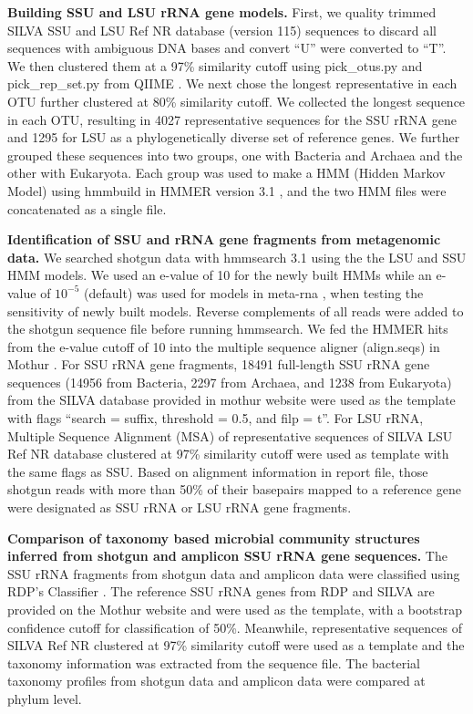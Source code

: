 \documentclass[12pt]{article}
\begin{document}
{\bf Building SSU and LSU rRNA gene models.} First, we quality
trimmed SILVA
\cite{silva2013} SSU and LSU Ref NR database (version 115) sequences
to discard all sequences with ambiguous DNA bases and convert
 ``U'' were converted to ``T''.  We then clustered them at a 97\%
similarity cutoff using pick\_otus.py and pick\_rep\_set.py from
QIIME \cite{qiime}. We next chose the longest representative in each OTU 
further clustered at 80\% similarity cutoff. We collected the longest
sequence in each OTU, resulting in 4027 representative
sequences for the SSU rRNA gene and 1295 for LSU as a phylogenetically
diverse set of reference genes. We further grouped these sequences
into two groups, one with Bacteria and Archaea and the other with
Eukaryota. Each group was used to make a HMM (Hidden Markov
Model) using hmmbuild in HMMER version 3.1 \cite{hmmer3}, and the two HMM
files were concatenated as a single file.

{\bf Identification of SSU and rRNA gene fragments from metagenomic
data.} We searched shotgun data with hmmsearch 3.1 using the the LSU and SSU
HMM models. We used an e-value of 10 for the
newly built HMMs while an e-value of $10^{-5}$ (default) was used for
models in meta-rna \cite{metarna}, when testing the sensitivity of
newly built models. Reverse complements of all reads were added to the
shotgun sequence file before running hmmsearch. We fed the HMMER hits from
the e-value cutoff of 10 into the multiple sequence
aligner (align.seqs) in Mothur
\cite{mothuraligner2009}. For SSU rRNA gene fragments, 18491
full-length SSU rRNA gene sequences (14956 from Bacteria, 2297 from
Archaea, and 1238 from Eukaryota) from the SILVA database
\cite{silva2013} provided in mothur website were used as the template
with flags ``search = suffix, threshold = 0.5, and filp = t''.  For
LSU rRNA, Multiple Sequence Alignment (MSA) of representative
sequences of SILVA LSU Ref NR database clustered at 97\% similarity
cutoff were used as template with the same flags as SSU. Based on
alignment information in report file, those shotgun reads with more
than 50\% of their basepairs mapped to a reference gene were designated
as SSU rRNA or LSU rRNA gene fragments.

{\bf Comparison of taxonomy based microbial community structures
inferred from shotgun and amplicon SSU rRNA gene sequences.} The SSU
rRNA fragments from shotgun data and amplicon data were classified
using RDP's Classifier \cite{rdpclassifier}. The reference SSU rRNA
genes from RDP and SILVA are provided on the Mothur website and were used
as the template,  with a bootstrap confidence cutoff for classification
of 50\%. Meanwhile, representative sequences of SILVA Ref NR clustered
at 97\% similarity cutoff were used as a template and the taxonomy
information was extracted from the sequence file. The bacterial
taxonomy profiles from shotgun data and amplicon data were compared at
phylum level.
\end{document}
